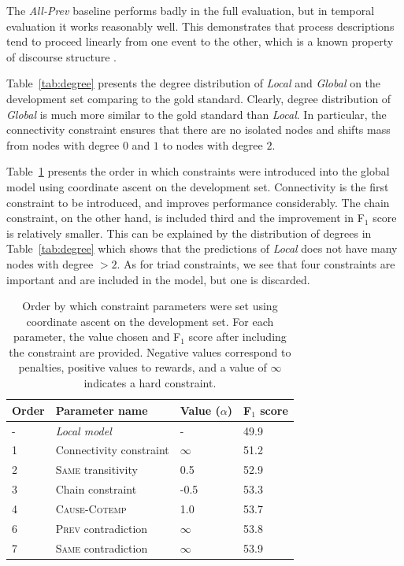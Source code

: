 The \emph{All-Prev} baseline performs badly in the full evaluation, but in temporal evaluation it works reasonably well. This demonstrates that process descriptions tend to proceed linearly from one event to the other, which is a known property of discourse structure \cite{schegloff73}.

Table~\ref{tab:degree} presents the degree distribution of \emph{Local} and \emph{Global} on the development set comparing to the gold standard. Clearly, degree distribution of \emph{Global} is much more similar to the gold standard than \emph{Local}. In particular, the connectivity constraint ensures that there are no isolated nodes and shifts mass from nodes with degree $0$ and $1$ to nodes with degree $2$.

Table~\ref{tab:paramtuning} presents the order in which constraints were introduced into the global model using coordinate ascent on the development set. Connectivity is the first constraint to be introduced, and improves performance considerably. The chain constraint, on the other hand, is included third and the improvement in F$_{1}$ score is relatively smaller. This can be explained by the distribution of degrees in Table~\ref{tab:degree} which shows that the predictions of \emph{Local} does not have many nodes with degree $>2$. As for triad constraints, we see that four constraints are important and are included in the model, but one is discarded.

\begin{table}[t]
{\footnotesize
\begin{tabular}{ l | l | l | l }
    \textbf{Order} & \textbf{Parameter name} & \textbf{Value} ($\alpha$)& \textbf{F$_1$ score} \\
\hline
- & \emph{Local model} & - & 49.9 \\
1 & Connectivity constraint & $\infty$ & 51.2 \\
2 & \textsc{Same} transitivity &  0.5 & 52.9 \\
3 & Chain constraint & -0.5 & 53.3\\
4 & \textsc{Cause}-\textsc{Cotemp} & 1.0 & 53.7\\
6 & \textsc{Prev} contradiction & $\infty$ & 53.8\\
7 & \textsc{Same} contradiction & $\infty$ & 53.9
\end{tabular}}
\caption{Order by which constraint parameters were set using coordinate ascent on the development set. For each parameter, the value chosen and F$_1$ score after including the constraint are provided. Negative values correspond to penalties, positive values to rewards, and a value of $\infty$ indicates a hard constraint.}
\label{tab:paramtuning}
\end{table}

